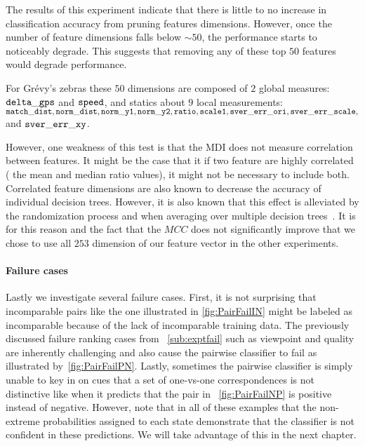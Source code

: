         The results of this experiment indicate that there is little to no increase in classification accuracy
          from pruning features dimensions.
          However, once the number of feature dimensions falls below ${\sim}50$, the performance starts to noticeably
          degrade.
        This suggests that removing any of these top $50$ features would degrade performance. 

        For Grévy's zebras these $50$ dimensions are composed of $2$ global measures:
        $\tt{delta\_gps}$ and $\tt{speed}$, and statics about $9$ local measurements:
        $\tt{match\_dist, norm\_dist, norm\_y1, norm\_y2, ratio, scale1, sver\_err\_ori, sver\_err\_scale,}$ and
          $\tt{sver\_err\_xy}$.

        However, one weakness of this test is that the MDI does not measure correlation between features.
        It might be the case that it if two feature are highly correlated (\eg{} the mean and median ratio
          values), it might not be necessary to include both.
        Correlated feature dimensions are also known to decrease the accuracy of individual decision trees.
        However, it is also known that this effect is alleviated by the randomization process and when averaging
          over multiple decision trees~\cite{louppe2014understanding}.
        It is for this reason and the fact that the $MCC$ does not significantly improve that we chose to use all
          $253$ dimension of our feature vector in the other experiments.

        \MatchPrune{}
        
        \paragraph{Failure cases}

        Lastly we investigate several failure cases.
        First, it is not surprising that incomparable pairs like the one illustrated in \cref{fig:PairFailIN}
          might be labeled as incomparable because of the lack of incomparable training data.
        The previously discussed failure ranking cases from ~\cref{sub:exptfail} such as viewpoint and quality
          are inherently challenging and also cause the pairwise classifier to fail as illustrated
          by~\cref{fig:PairFailPN}.
        Lastly, sometimes the pairwise classifier is simply unable to key in on cues that a set of one-vs-one
          correspondences is not distinctive like when it predicts that the pair in ~\cref{fig:PairFailNP} is
          positive instead of negative.
        However, note that in all of these examples that the non-extreme probabilities assigned to each state
          demonstrate that the classifier is not confident in these predictions.
        We will take advantage of this in the next chapter.
        

